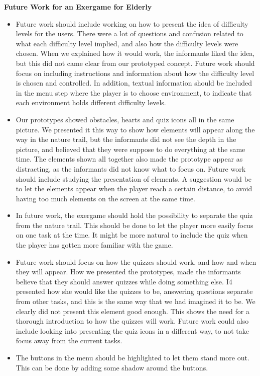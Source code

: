 \textbf{Future Work for an Exergame for Elderly}
\begin{itemize}
\renewcommand{\labelitemi}{$\bullet$}
\item Future work should include working on how to present the idea of difficulty levels for the users. There were a lot of questions and confusion related to what each difficulty level implied, and also how the difficulty levels were chosen. When we explained how it would work, the informants liked the idea, but this did not came clear from our prototyped concept. Future work should focus on including instructions and information about how the difficulty level is chosen and controlled. In addition, textual information should be included in the menu step where the player is to choose environment, to indicate that each environment holds different difficulty levels.  
\item Our prototypes showed obstacles, hearts and quiz icons all in the same picture. We presented it this way to show how elements will appear along the way in the nature trail, but the informants did not see the depth in the picture, and believed that they were suppose to do everything at the same time. The elements shown all together also made the prototype appear as distracting, as the informants did not know what to focus on. Future work should include studying the presentation of elements. A suggestion would be to let the elements appear when the player reach a certain distance, to avoid having too much elements on the screen at the same time.
\item In future work, the exergame should hold the possibility to separate the quiz from the nature trail. This should be done to let the player more easily focus on one task at the time. It might be more natural to include the quiz when the player has gotten more familiar with the game.
\item Future work should focus on how the quizzes should work, and how and when they will appear. How we presented the prototypes, made the informants believe that they should answer quizzes while doing something else. I4 presented how she would like the quizzes to be, answering questions separate from other tasks, and this is the same way that we had imagined it to be. We clearly did not present this element good enough. This shows the need for a thorough introduction to how the quizzes will work. Future work could also include looking into presenting the quiz icons in a different way, to not take focus away from the current tasks. 
\item The buttons in the menu should be highlighted to let them stand more out. This can be done by adding some shadow around the buttons.

\end{itemize}
